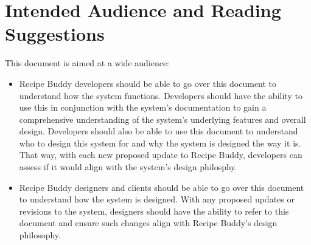 \documentclass{scrreprt}
\begin{document}
\section{Intended Audience and Reading Suggestions}
$ $This document is aimed at a wide audience:
\begin{itemize}
    \item \gls{Recipe Buddy} developers should be able to go over this document to understand how the system functions.
          Developers should have the ability to use this in conjunction with the system's documentation to gain a comprehensive understanding of the system's underlying features and overall design.
          Developers should also be able to use this document to understand who to design this system for and why the system is designed the way it is.
          That way, with each new proposed update to \gls{Recipe Buddy}, developers can assess if it would align with the system's design philosphy.
    \item \gls{Recipe Buddy} designers and clients should be able to go over this document to understand how the system is designed.
          With any proposed updates or revisions to the system, designers should have the ability to refer to this document and ensure such changes align with \gls{Recipe Buddy}'s design philosophy.
\end{itemize}
$ $
\end{document}

